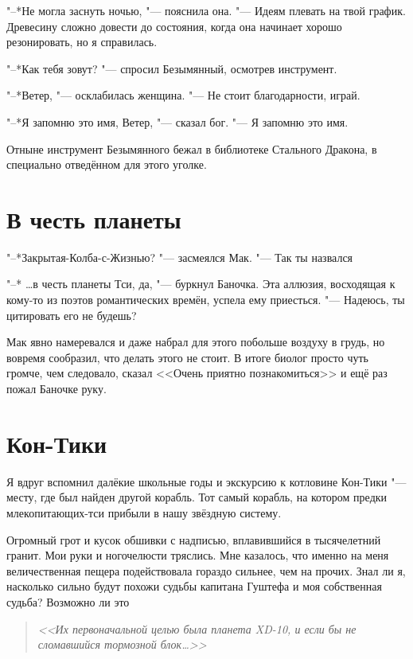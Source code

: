 \documentclass[a4paper,10pt]{book}
\newcommand{\ldotst}{\so{...}\xspace}
\newcommand{\ldotsq}{\so{?\hbox{\hspace{-.212em}}..}\xspace}
\begin{document}
"--*Не могла заснуть ночью, "--- пояснила она. "--- Идеям плевать на твой 
график. Древесину сложно довести до состояния, когда она начинает хорошо 
резонировать, но я справилась.

"--*Как тебя зовут? "--- спросил Безымянный, осмотрев инструмент.

"--*Ветер, "--- осклабилась женщина. "--- Не стоит благодарности, играй.

"--*Я запомню это имя, Ветер, "--- сказал бог. "--- Я запомню это имя.

Отныне инструмент Безымянного бежал в библиотеке Стального Дракона, в 
специально отведённом для этого уголке.
 
\section{В честь планеты}
 
"--*Закрытая-Колба-с-Жизнью? "--- засмеялся Мак. "--- Так ты назвался\ldotst

"--* \dots в честь планеты Тси, да, "--- буркнул Баночка. Эта аллюзия, 
восходящая
к кому-то из поэтов романтических времён, успела ему приесться. "--- Надеюсь, 
ты 
цитировать его не будешь?

Мак явно намеревался и даже набрал для этого побольше воздуху в грудь, но 
вовремя сообразил,
что делать этого не стоит. В итоге биолог просто чуть громче, чем следовало, 
сказал <<Очень приятно познакомиться>>
и ещё раз пожал Баночке руку.
 
\section{Кон-Тики}

 Я вдруг вспомнил далёкие школьные годы и экскурсию к котловине Кон-Тики "---
месту, где был найден другой корабль. Тот самый корабль, на котором предки 
млекопитающих-тси прибыли в нашу звёздную систему.

Огромный грот и кусок обшивки с надписью, вплавившийся в тысячелетний гранит. 
Мои руки и ногочелюсти тряслись. Мне казалось, что именно на меня 
величественная пещера подействовала гораздо сильнее, чем на прочих.
Знал ли я, насколько сильно будут похожи судьбы капитана Гуштефа и моя 
собственная судьба? Возможно ли это\ldotsq

\begin{quote}\textit{<<Их первоначальной целью была планета XD-10,
и если бы не сломавшийся тормозной блок\ldots>>}\end{quote}
\end{document}
